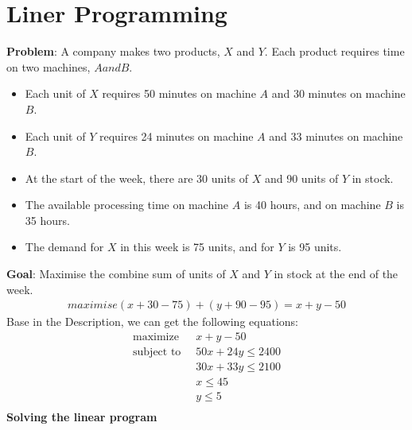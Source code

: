 \documentclass[onecolumn]{report}
\begin{document}
\chapter{Liner Programming}
\textbf{Problem}: A company makes two products, $X$ and $Y$. Each product requires time on two machines, $A and B$.
\begin{itemize}
    \item Each unit of $X$ requires 50 minutes on machine $A$ and 30 minutes on machine $B$.
    \item Each unit of $Y$ requires 24 minutes on machine $A$ and 33 minutes on machine $B$.
    \item At the start of the week, there are 30 units of $X$ and 90 units of $Y$ in stock.
    \item The available processing time on machine $A$ is 40 hours, and on machine $B$ is 35 hours.
    \item The demand for $X$ in this week is 75 units, and for $Y$ is 95 units.
\end{itemize}
\textbf{Goal}: Maximise the combine sum of units of $X$ and $Y$ in stock at the end of the week.
\begin{align*}
    maximise(x+30-75)+(y+90-95)=x+y-50
\end{align*}
Base in the Description, we can get the following equations:
\begin{align*}
    \text{maximize  } \:& x+y-50\\
    \text{subject to  } \:& 50x+24y \leq 2400\\
    & 30x+33y \leq 2100\\
    & x \leq 45\\
    & y \leq 5\\
\end{align*}
\textbf{Solving the linear program}\\
\begin{center}
\end{center}
\end{document}
